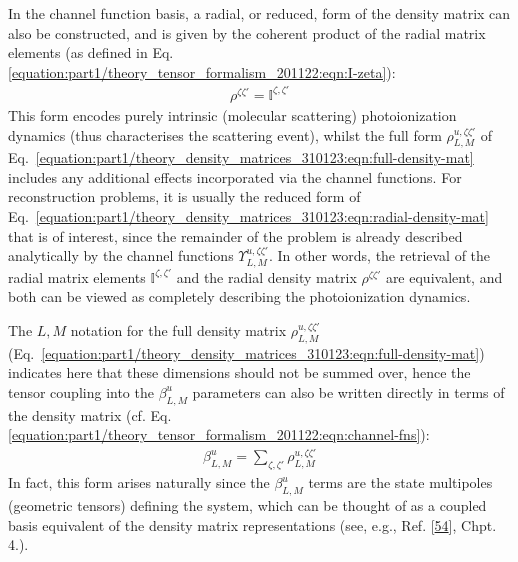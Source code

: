 \documentclass[letterpaper,table,10pt,english]{jupyterBook}
\begin{document}
\sphinxAtStartPar
In the channel function basis, a radial, or reduced, form of the density matrix can also be constructed, and is given by the coherent product of the radial matrix elements (as defined in Eq. \eqref{equation:part1/theory_tensor_formalism_201122:eqn:I-zeta}):
\begin{equation}\label{equation:part1/theory_density_matrices_310123:eqn:radial-density-mat}
\begin{split}
\rho^{\zeta\zeta'} = \mathbb{I}^{\zeta,\zeta'}
\end{split}
\end{equation}
\sphinxAtStartPar
This form encodes purely intrinsic (molecular scattering) photoionization dynamics (thus characterises the scattering event), whilst the full form \({\rho}_{L,M}^{u,\zeta\zeta'}\) of Eq. \eqref{equation:part1/theory_density_matrices_310123:eqn:full-density-mat} includes any additional effects incorporated via the channel functions. For reconstruction problems, it is usually the reduced form of Eq. \eqref{equation:part1/theory_density_matrices_310123:eqn:radial-density-mat} that is of interest, since the remainder of the problem is already described analytically by the channel functions \(\varUpsilon_{L,M}^{u,\zeta\zeta'}\). In other words, the retrieval of the radial matrix elements \(\mathbb{I}^{\zeta,\zeta'}\) and the radial density matrix \(\rho^{\zeta\zeta'}\) are equivalent, and both can be viewed as completely describing the photoionization dynamics.

\sphinxAtStartPar
The \(L,M\) notation for the full density matrix \({\rho}_{L,M}^{u,\zeta\zeta'}\) (Eq. \eqref{equation:part1/theory_density_matrices_310123:eqn:full-density-mat}) indicates here that these dimensions should not be summed over, hence the tensor coupling into the \(\beta_{L,M}^{u}\) parameters can also be written directly in terms of the density matrix (cf. Eq. \eqref{equation:part1/theory_tensor_formalism_201122:eqn:channel-fns}):
\begin{equation}\label{equation:part1/theory_density_matrices_310123:eqn:beta-density-mat}
\begin{split}
\beta_{L,M}^{u}=\sum_{\zeta,\zeta'}{\rho}_{L,M}^{u,\zeta\zeta'}
\end{split}
\end{equation}
\sphinxAtStartPar
In fact, this form arises naturally since the \(\beta_{L,M}^{u}\) terms are the state multipoles (geometric tensors) defining the system, which can be thought of as a coupled basis equivalent of the density matrix representations (see, e.g., Ref. {[}\hyperlink{cite.backmatter/bibliography:id479}{54}{]}, Chpt. 4.).
\end{document}
